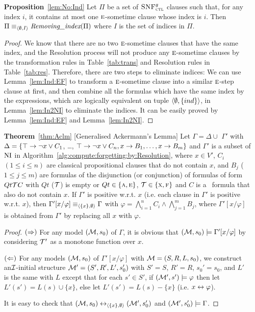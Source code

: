 \documentclass[twoside,11pt]{article}
\begin{document}
	
	\noindent\textbf{Proposition}~\ref{lem:No:Ind}
	Let $\Pi$ be a set of ${\textsc{SNF}_{\textsc{ctl}}^g}$ clauses such that, for any index $i$, it contains at most one
	$\textsc{e}$-sometime clause whose index is $i$. Then
	$\Pi\equiv_{{\langle{\emptyset, I}\rangle}}  \emph{Removing\_index}(\Pi)$
	where $I$ is the set of indices in $\Pi$.
	\\
	\begin{proof}
		We know that there are no two $\textsc{e}$-sometime clauses that have the same index, and the Resolution process will  not produce any $\textsc{e}$-sometime clauses by the transformation rules in Table~\ref{tab:trans} and Resolution rules in Table~\ref{tab:res}.
		Therefore, there are two steps to eliminate indices: We can use Lemma~\ref{lem:Ind:EF} to transform a $\textsc{e}$-sometime clause into a similar $\textsc{e}$-step clause at first, and then combine all the formulas which have the same index by the expressions, which are logically equivalent on tuple ${\langle{\emptyset, \{ind\}}\rangle}$, in Lemma~\ref{lem:In2NI} to eliminate the indices.
		It can be easily proved by Lemma~\ref{lem:Ind:EF} and Lemma~\ref{lem:In2NI}.
	\end{proof}
	
	
	\noindent\textbf{Theorem}~\ref{thm:Aclm} [Generalised Ackermann’s Lemma]
	Let $\Gamma = \Delta\cup$ $ \Gamma'$ with $\Delta = \{\top \rightarrow \neg x \vee C_1$, \dots, $\top \rightarrow \neg x \vee C_n, x \rightarrow B_1, \dots, x \rightarrow B_m\}$ and $\Gamma'$ is a subset of $\textrm{NI}$ in Algorithm~\ref{alg:compute:forgetting:by:Resolution}, where $x\in V'$,
	$C_i$ $(1 \leq i \leq n)$ are classical propositional clauses that do not contain $x$, and $B_j$ ($1 \leq j \leq m$) are formulas of the disjunction (or conjunction) of formulas of form $Qt {\cal T} C$ with $Qt$ (${\cal T}$) is empty or $Qt \in \{\textsc{a}, \textsc{e}\}$, ${\cal T}\in \{\textsc{x}, \textsc{f}\}$ and $C$ is a \CTL\ formula that also do not contain $x$. If $\Gamma'$ is positive w.r.t. $x$ (i.e. each clause in $\Gamma'$ is positive w.r.t. $x$), then $\Gamma'[x/\varphi] \equiv_{{\langle{\{x\}, \emptyset}\rangle}} \Gamma$ with $\varphi = \bigwedge_{i=1}^n C_i \wedge \bigwedge_{j=1}^m B_j$, where $\Gamma'[x/\varphi]$ is obtained from $\Gamma'$ by replacing all $x$ with $\varphi$.
	\\
	\begin{proof}
		$(\Rightarrow)$ For any model $({\cal M}, s_0)$ of $\Gamma$, it is obvious that $({\cal M}, s_0) \models \Gamma'[x/\varphi]$ by considering ${\cal T}'$ as a monotone function over $x$.
		
		$(\Leftarrow)$ For any models $({\cal M}, s_0)$ of $\Gamma'[x/\varphi]$ with ${\cal M} = (S, R, L, s_0)$, we construct an${\cal I}$-initial structure ${\cal M}'=(S', R', L', s_0')$ with $S'=S$, $R'=R$, $s_0'= s_0$, and $L'$ is the same with $L$ except that for each $s'\in S'$, if $({\cal M}', s') \models \varphi$ then let $L'(s') = L(s) \cup \{x\}$, else let $L'(s') = L(s)-\{x\}$ (i.e. $x \leftrightarrow \varphi$).
		
		It is easy to check that $({\cal M},s_0) \leftrightarrow_{{\langle{\{x\}, \emptyset}\rangle}} ({\cal M}', s_0')$ and $({\cal M}',s_0') \models \Gamma$.
	\end{proof}
	
\end{document}
